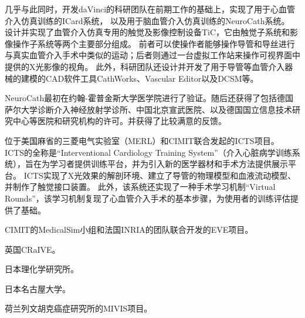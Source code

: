 几乎与此同时，开发daVinci的科研团队在前期工作的基础上，实现了用于心血管介入仿真训练的ICard系统\cite{Wang1997ICard}\cite{Chui1998ICard}\cite{Wang1998ICard}\cite{Lim1997ICard}，
以及用于脑血管介入仿真训练的NeuroCath系统\cite{Ma2000NeuroCath}\cite{Nowinski2000NeuroCath}\cite{Ma2001NeuroCath}\cite{Li2001NeuroCath}\cite{Nowinski2001NeuroCath}\cite{Anderson2001NeuroCath}\cite{Chui2002NeuroCath}\cite{Anderson2002NeuroCath}\cite{Ma2004NeuroCath}\cite{Volkau2005Vessel}\cite{Ma2005NeuroCath}\cite{Ma2006NeuroCath}\cite{Ma2006aNeuroCath}\cite{Ma2007NeuroCath}。
设计并实现了血管介入仿真专用的触觉及影像控制设备TiC\cite{Chui1999TiC}\cite{Ma1999TiC}，它由触觉子系统和影像操作子系统等两个主要部分组成。
前者可以使操作者能够操作导管和导丝进行与真实血管介入手术中类似的运动；后者则通过一台虚拟工作站来操作可视界面中提供的X光影像的视角。
此外，科研团队还设计并开发了用于导管等血管介入器械的建模的CAD软件工具CathWorks\cite{Cai1998CathWorks}\cite{Cai2000CathWorks}、Vascular Editor\cite{Ma2007NeuroCath}以及DCSM\cite{Li2001DCSM}等。

NeuroCath最初在约翰-霍普金斯大学医学院进行了验证。随后还获得了包括德国萨尔大学诊断介入神经放射学诊所、中国北京宣武医院、以及德国国立信息技术研究中心等医院和研究机构的许可。并获得了比较满意的反馈\cite{Ma2007NeuroCath}。

位于美国麻省的三菱电气实验室（MERL）和CIMIT联合发起的ICTS项目\cite{Dawson2000ICTS}\cite{Cotin2000ICTS}\cite{Shaffer1999ICTS}。
ICTS的全称是“Interventional Cardiology Training System”（介入心脏病学训练系统），旨在为学习者提供训练平台，并为引入新的医学器材和手术方法提供展示平台\cite{Cotin2000ICTS}。
ICTS实现了X光效果的解剖环境、建立了导管的物理模型和血液流动模型、并制作了触觉接口装置\cite{Cotin2000ICTS}。
此外，该系统还实现了一种手术学习机制“Virtual Rounds”\cite{Shaffer1999ICTS}，该学习机制复现了心血管介入手术的基本步骤，为使用者的训练评估提供了基础。

CIMIT的MedicalSim小组和法国INRIA的团队联合开发的EVE项目\cite{Luboz2005MedicalSim}\cite{Wu2005MedicalSim}\cite{Cotin2005EVE}\cite{Duriez2006MedicalSim}\cite{Lenoir2006MedicaSim}\cite{Wu2007EVE}\cite{dequidt2007}。

英国CRaIVE\cite{Coles2010CRaIVE}\cite{Coles2011CRaIVE}\cite{Coles2009CRaIVE}\cite{Luboz2008CRaIVE}\cite{luboz2009CRaIVE}\cite{Luboz2010CRaIVE}\cite{Luboz2009aCRaIVE}\cite{Wu2011MedicalSim}。

日本理化学研究所\cite{takashima2009RIKEN}\cite{takashima2007RIKEN}。

日本名古屋大学\cite{Ikeda2005Nagoya}。

荷兰列文胡克癌症研究所的MIVIS项目\cite{Konings2003NKI}\cite{alderliesten2002NKI}\cite{alderliesten2004NKI}\cite{alderliesten2007NKI}\cite{alderliesten2007aNKI}\cite{Bosman2005NKI}。

